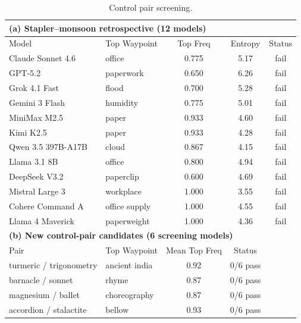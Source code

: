 \begin{table}[t]
\centering
\caption{Control pair screening.}
\label{tab:control}
\small
\begin{tabular}{llccc}
\toprule
    \multicolumn{5}{l}{\textbf{(a) Stapler--monsoon retrospective (12 models)}} \\
    \midrule
    Model & Top Waypoint & Top Freq & Entropy & Status \\
    \midrule
    Claude Sonnet 4.6 & office & 0.775 & 5.17 & fail \\
    GPT-5.2 & paperwork & 0.650 & 6.26 & fail \\
    Grok 4.1 Fast & flood & 0.700 & 5.28 & fail \\
    Gemini 3 Flash & humidity & 0.775 & 5.01 & fail \\
    MiniMax M2.5 & paper & 0.933 & 4.60 & fail \\
    Kimi K2.5 & paper & 0.933 & 4.28 & fail \\
    Qwen 3.5 397B-A17B & cloud & 0.867 & 4.15 & fail \\
    Llama 3.1 8B & office & 0.800 & 4.94 & fail \\
    DeepSeek V3.2 & paperclip & 0.600 & 4.69 & fail \\
    Mistral Large 3 & workplace & 1.000 & 3.55 & fail \\
    Cohere Command A & office supply & 1.000 & 4.55 & fail \\
    Llama 4 Maverick & paperweight & 1.000 & 4.36 & fail \\
    \midrule
    \multicolumn{5}{l}{\textbf{(b) New control-pair candidates (6 screening models)}} \\
    \midrule
    Pair & Top Waypoint & Mean Top Freq & Status & \\
    \midrule
    turmeric / trigonometry & ancient india & 0.92 & 0/6 pass \\
    barnacle / sonnet & rhyme & 0.87 & 0/6 pass \\
    magnesium / ballet & choreography & 0.87 & 0/6 pass \\
    accordion / stalactite & bellow & 0.93 & 0/6 pass \\
\bottomrule
\end{tabular}
\end{table}

